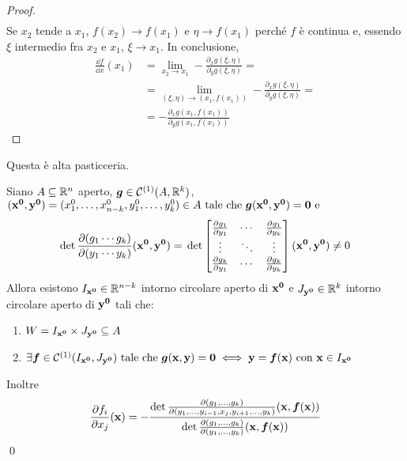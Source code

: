 \begin{proof}
\begin{gather*}
    \end{gather*}
    Se $x_2$ tende a $x_1$, $f(x_2)\to f(x_1)$ e $\eta \to f(x_1)$ perché $f$ è continua e, essendo $\xi$ intermedio fra $x_2$ e $x_1$, $\xi \to x_1$. In conclusione,
    \begin{align*}
        \frac{\dd f}{\dd x}(x_1)&=\lim_{x_2\to x_1}-\frac{\partial_x g(\xi,\eta)}{\partial_y g(\xi,\eta)}=\\
        &=\lim_{(\xi,\eta)\to(x_1,f(x_1))}-\frac{\partial_x g(\xi,\eta)}{\partial_y g(\xi,\eta)}=\\
        &=-\frac{\partial_x g(x_1,f(x_1))}{\partial_y g(x_1,f(x_1))}
    \end{align*}
\end{proof}

\begin{remark}
    Questa è alta pasticceria.
\end{remark}

\begin{theorem}
    Siano $A\subseteq \mathbb{R}^n$ aperto, $\bm g \in \mathcal{C}^{(1)}(A,\mathbb{R}^k)$, $(\vb{x^0}, \vb{y^0})=(x_1^0,\dots,x_{n-k}^0,y_1^0,\dots,y_{k}^0) \in A \text{ tale che } \bm g(\vb{x^0}, \vb{y^0})=\vb{0} \text{ e }$
    $$
        \det\frac{\partial(g_1\cdots g_k)}{\partial (y_1 \cdots y_k)}(\vb{x^0}, \vb{y^0})=\\
        \det\begin{bmatrix}
            \frac{\partial g_1}{\partial y_1} & \cdots & \frac{\partial g_1}{\partial y_k}\\
            \vdots & \ddots & \vdots \\
            \frac{\partial g_k}{\partial y_1} & \cdots & \frac{\partial g_k}{\partial y_k}
        \end{bmatrix}
        (\vb{x^0}, \vb{y^0}) \neq 0
    $$
    Allora esistono $I_{\vb{x^0}} \in \mathbb{R}^{n-k}$ intorno circolare aperto di $\vb{x^0}$ e $J_{\vb{y^0}} \in \mathbb{R}^k$ intorno circolare aperto di $\vb{y^0}$ tali che:
    \begin{enumerate}
        \item $W=I_{\vb{x^0}}\times J_{\vb{y^0}} \subseteq A$
        \item $\exists \bm f \in \mathcal{C}^{(1)}(I_{\vb{x^0}}, J_{\vb{y^0}}) \text{ tale che } \bm g(\vb{x}, \vb{y})=\vb{0} \iff \vb{y} = \bm f (\vb{x}) \text{ con } \vb{x} \in I_{\vb{x^0}}$
    \end{enumerate}
    Inoltre
    $$
        \frac{\partial f_i}{\partial x_j}(\vb{x})=-\frac
        {\det \frac{\partial (g_1,\dots,g_k)}{\partial (y_1,\dots,y_{i-1},x_j,y_{i+1},\dots,y_k)}(\vb{x},\bm f(\vb{x}))}
        {\det \frac{\partial (g_1,\dots,g_k)}{\partial (y_1,\dots,y_k)}(\vb{x},\bm f(\vb{x}))}
    $$
    \qed
\end{theorem}

